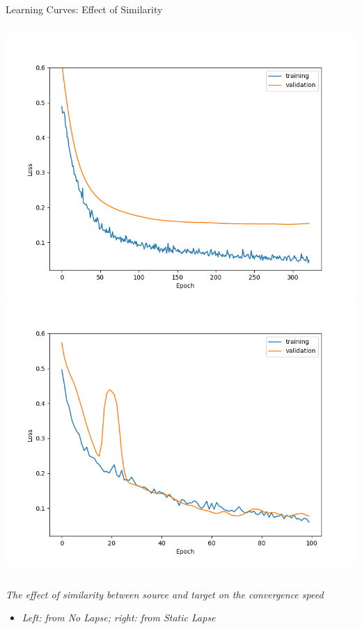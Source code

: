 \documentclass[9pt,handout]{beamer}
\begin{document}
    \begin{frame}{Learning Curves: Effect of Similarity}
    \begin{columns}
    \includegraphics[height=0.8\textheight]{../project3/figures/figure3a.png}
    \includegraphics[height=0.8\textheight]{../project3/figures/figure3b.png}
    \end{columns}
    
    \textit{The effect of similarity between source and target on the convergence speed}
    \begin{itemize}
        \item \textit{Left: from No Lapse; right: from Static Lapse}
    \end{itemize}
    \end{frame}
    
\end{document}
